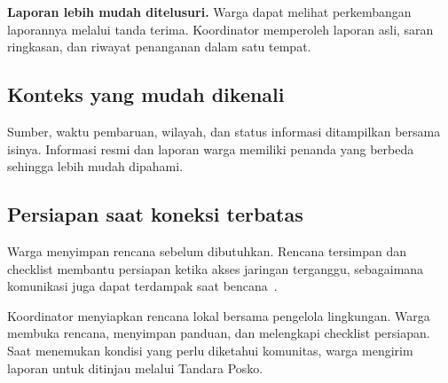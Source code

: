 \documentclass[10pt,a4paper]{article}
\begin{document}
\begin{Callout}
\textbf{Laporan lebih mudah ditelusuri.} Warga dapat melihat perkembangan laporannya melalui tanda terima. Koordinator memperoleh laporan asli, saran ringkasan, dan riwayat penanganan dalam satu tempat.
\end{Callout}

\begin{minipage}[t]{.48\linewidth}\vspace{0pt}\raggedright
\subsection*{Konteks yang mudah dikenali}
Sumber, waktu pembaruan, wilayah, dan status informasi ditampilkan bersama isinya. Informasi resmi dan laporan warga memiliki penanda yang berbeda sehingga lebih mudah dipahami.
\end{minipage}\hfill
\begin{minipage}[t]{.48\linewidth}\vspace{0pt}\raggedright
\subsection*{Persiapan saat koneksi terbatas}
Warga menyimpan rencana sebelum dibutuhkan. Rencana tersimpan dan checklist membantu persiapan ketika akses jaringan terganggu, sebagaimana komunikasi juga dapat terdampak saat bencana~\cite{itu}.
\end{minipage}
\newpage

Koordinator menyiapkan rencana lokal bersama pengelola lingkungan. Warga membuka rencana, menyimpan panduan, dan melengkapi checklist persiapan. Saat menemukan kondisi yang perlu diketahui komunitas, warga mengirim laporan untuk ditinjau melalui Tandara Posko.

\begin{center}\end{center}
\end{document}
